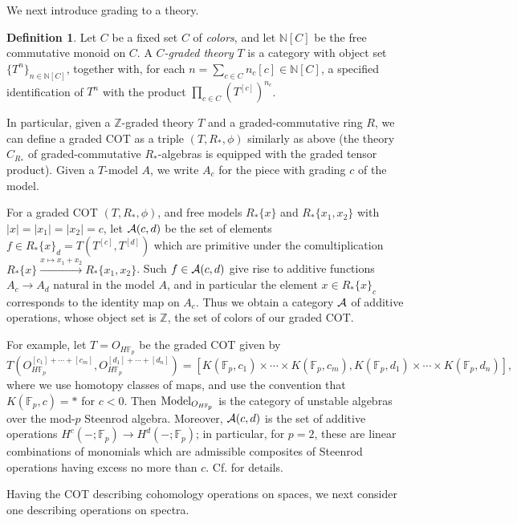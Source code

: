 \documentclass{gtpart}
\theoremstyle{definition}
\newtheorem{defn}[thm]{Definition}
\theoremstyle{remark}
\newcommand{\mb}[1]{\mathbb{#1}}
\newcommand{\Model}{{\rm Model}}
\begin{document}
We next introduce grading to a theory.  
\begin{defn}
 Let $C$ be a fixed set $C$ of {\em colors}, and let ${\mb N}[C]$ be the 
 free commutative monoid on $C$.  A {\em $C$-graded theory} $T$ is a 
 category with object set $\{T^n\}_{n \in {\mb N}[C]}$, together with, 
 for each $n = \sum_{c \in C} n_c[c] \in {\mb N}[C]$, a specified 
 identification of $T^n$ with the product 
 $\prod_{c \in C} (T^{[c]})^{n_c}$.  
\end{defn}
In particular, given a $\mb Z$-graded theory $T$ and a graded-commutative 
ring $R$, we can define a graded COT as a triple $(T,R_*,\phi)$ similarly 
as above (the theory $C_{R_*}$ of graded-commutative $R_*$-algebras is 
equipped with the graded tensor product).  Given a $T$-model $A$, we write 
$A_c$ for the piece with grading $c$ of the model.  

For a graded COT $(T,R_*,\phi)$, and free models $R_*\{x\}$ and 
$R_*\{x_1,x_2\}$ with $|x| = |x_1| = |x_2| = c$, let ${\cal A}(c,d)$ 
be the set of elements $f \in R_*\{x\}_d = T(T^{[c]},T^{[d]})$ which are 
primitive under the comultiplication 
$R_*\{x\} \xrightarrow{x \mapsto x_1 + x_2} R_*\{x_1,x_2\}$.  Such 
$f \in {\cal A}(c,d)$ give rise to additive functions $A_c \to A_d$ 
natural in the model $A$, and in particular the element $x \in R_*\{x\}_c$ 
corresponds to the identity map on $A_c$.  Thus we obtain a category 
$\cal A$ of additive operations, whose object set is $\mb Z$, the set of 
colors of our graded COT.  

For example, let $T = O_{H{\mb F}_p}$ be the graded COT given by 
\[
 T(O_{H{\mb F}_p}^{[c_1]+\cdots+[c_m]},O_{H{\mb F}_p}^{[d_1]+\cdots+[d_n]}) 
 = [K({\mb F}_p,c_1) \times \cdots \times K({\mb F}_p,c_m), 
 K({\mb F}_p,d_1) \times \cdots \times K({\mb F}_p,d_n)],
\]
where we use homotopy classes of maps, and use the convention that 
$K({\mb F}_p,c) = *$ for $c<0$.  Then $\Model_{O_{H{\mb F}_p}}$ is the 
category of unstable algebras over the mod-$p$ Steenrod algebra.  
Moreover, ${\cal A}(c,d)$ is the set of additive operations 
$H^c(-;{\mb F}_p) \to H^d(-;{\mb F}_p)$; in particular, for $p=2$, these 
are linear combinations of monomials which are admissible composites of Steenrod 
operations having excess no more than $c$.  Cf. \cite[section 4.L]{at} for details.  

Having the COT describing cohomology operations on spaces, we next 
consider one describing operations on spectra.  
\end{document}
